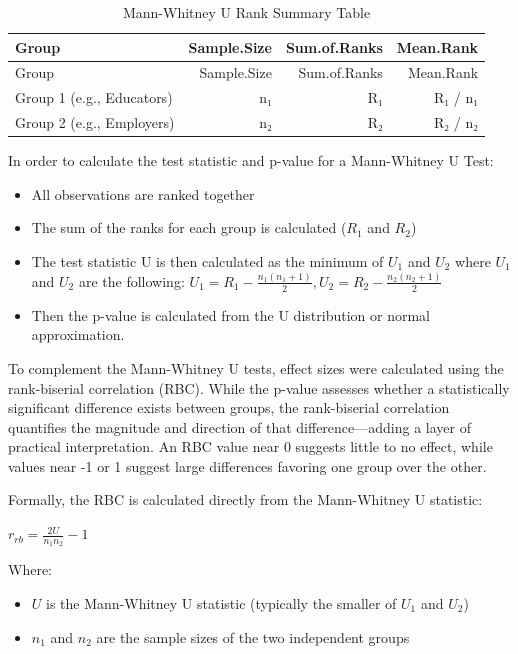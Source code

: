 \documentclass[
  12pt,
  letterpaper,
  DIV=11,
  numbers=noendperiod]{scrartcl}
\providecommand{\tightlist}{%
  \setlength{\itemsep}{0pt}\setlength{\parskip}{0pt}}\usepackage{longtable,booktabs,array}
\numberwithin{figure}{section}
\numberwithin{table}{section}
\begin{document}
\begin{longtable}[]{@{}lrrr@{}}
\caption{Mann-Whitney U Rank Summary Table}\tabularnewline
\toprule\noalign{}
Group & Sample.Size & Sum.of.Ranks & Mean.Rank \\
\midrule\noalign{}
\endfirsthead
\toprule\noalign{}
Group & Sample.Size & Sum.of.Ranks & Mean.Rank \\
\midrule\noalign{}
\endhead
\bottomrule\noalign{}
\endlastfoot
Group 1 (e.g., Educators) & n₁ & R₁ & R₁ / n₁ \\
Group 2 (e.g., Employers) & n₂ & R₂ & R₂ / n₂ \\
\end{longtable}

In order to calculate the test statistic and p-value for a Mann-Whitney
U Test:

\begin{itemize}
\tightlist
\item
  All observations are ranked together
\item
  The sum of the ranks for each group is calculated (\(R_1\) and
  \(R_2\))
\item
  The test statistic U is then calculated as the minimum of \(U_1\) and
  \(U_2\) where \(U_1\) and \(U_2\) are the following:
  \(U_1 = R_1 - \frac{n_1(n_1 + 1)}{2},  U_2 = R_2 - \frac{n_2(n_2 + 1)}{2}\)
\item
  Then the p-value is calculated from the U distribution or normal
  approximation.
\end{itemize}

To complement the Mann-Whitney U tests, effect sizes were calculated
using the rank-biserial correlation (RBC). While the p-value assesses
whether a statistically significant difference exists between groups,
the rank-biserial correlation quantifies the magnitude and direction of
that difference---adding a layer of practical interpretation. An RBC
value near 0 suggests little to no effect, while values near -1 or 1
suggest large differences favoring one group over the other.

Formally, the RBC is calculated directly from the Mann-Whitney U
statistic:

\(r_{rb} = \frac{2U}{n_1n_2} - 1\)

Where:

\begin{itemize}
\tightlist
\item
  \(U\) is the Mann-Whitney U statistic (typically the smaller of
  \(U_1\) and \(U_2\))\\
\item
  \(n_1\) and \(n_2\) are the sample sizes of the two independent groups
\end{itemize}
\end{document}
